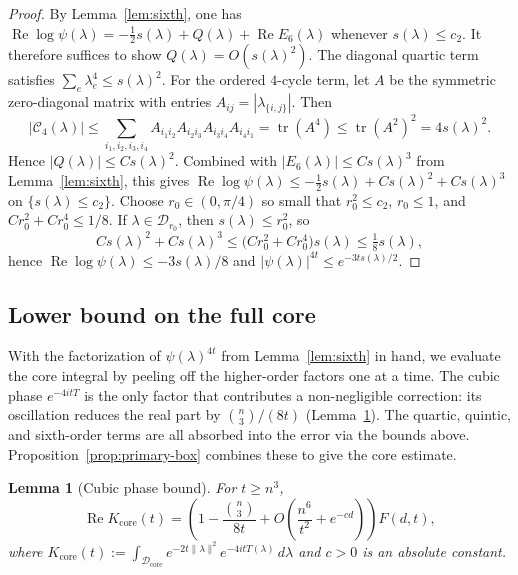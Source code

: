 \documentclass[11pt]{article}
\newtheorem{lemma}[theorem]{Lemma}
\theoremstyle{definition}
\newcommand{\Dd}{\mathcal{D}}
\newcommand{\corereg}{\mathcal{D}_\mathrm{core}}
\newcommand{\RePart}{\operatorname{Re}}
\begin{document}
\begin{proof}
By Lemma~\ref{lem:sixth}, one has
\(\RePart\log\psi(\lambda)=-\frac12 s(\lambda)+Q(\lambda)+\RePart E_6(\lambda)\)
whenever \(s(\lambda)\le c_2\). It therefore suffices to show
\(Q(\lambda)=O(s(\lambda)^2)\). The diagonal quartic term satisfies
\(\sum_e \lambda_e^4\le s(\lambda)^2\).
For the ordered \(4\)-cycle term, let \(A\) be the symmetric zero-diagonal matrix with entries \(A_{ij}=|\lambda_{\{i,j\}}|\). Then
\[
  |\mathcal{C}_4(\lambda)|
  \le \sum_{i_1,i_2,i_3,i_4}
    A_{i_1i_2}A_{i_2i_3}A_{i_3i_4}A_{i_4i_1}
  = \operatorname{tr}(A^4)
  \le \operatorname{tr}(A^2)^2
  = 4s(\lambda)^2.
\]
Hence \(|Q(\lambda)|\le C s(\lambda)^2\).
Combined with \(|E_6(\lambda)|\le C s(\lambda)^3\) from Lemma~\ref{lem:sixth}, this gives \(\RePart\log\psi(\lambda)\le -\tfrac12 s(\lambda)+C s(\lambda)^2 + C s(\lambda)^3\) on \(\{s(\lambda)\le c_2\}\).
Choose \(r_0\in(0,\pi/4)\) so small that \(r_0^2\le c_2\), \(r_0\le 1\), and \(C r_0^2 + C r_0^4 \le 1/8\). If \(\lambda\in\Dd_{r_0}\), then \(s(\lambda)\le r_0^2\), so
\[
  C s(\lambda)^2 + C s(\lambda)^3
  \le \bigl(Cr_0^2 + Cr_0^4\bigr)s(\lambda)
  \le \tfrac18 s(\lambda),
\]
hence \(\RePart\log\psi(\lambda)\le -3s(\lambda)/8\) and \(|\psi(\lambda)|^{4t}\le e^{-3t s(\lambda)/2}\).
\end{proof}

\subsection{Lower bound on the full core}

With the factorization of \(\psi(\lambda)^{4t}\) from Lemma~\ref{lem:sixth} in hand, we evaluate the core integral by peeling off the higher-order factors one at a time. The cubic phase \(e^{-4itT}\) is the only factor that contributes a non-negligible correction: its oscillation reduces the real part by \(\binom{n}{3}/(8t)\) (Lemma~\ref{lem:cubic}). The quartic, quintic, and sixth-order terms are all absorbed into the error via the bounds above. Proposition~\ref{prop:primary-box} combines these to give the core estimate.

\begin{lemma}[Cubic phase bound]\label{lem:cubic}
For \(t\ge n^3\),
\[
  \RePart K_{\mathrm{core}}(t)
  =
  \left(1-\frac{\binom{n}{3}}{8t}+O\!\left(\frac{n^6}{t^2}+e^{-cd}\right)\right)F(d,t),
\]
where \(K_{\mathrm{core}}(t):=\int_{\corereg}e^{-2t\|\lambda\|^2}e^{-4itT(\lambda)}\,d\lambda\) and \(c>0\) is an absolute constant.
\end{lemma}
\end{document}
